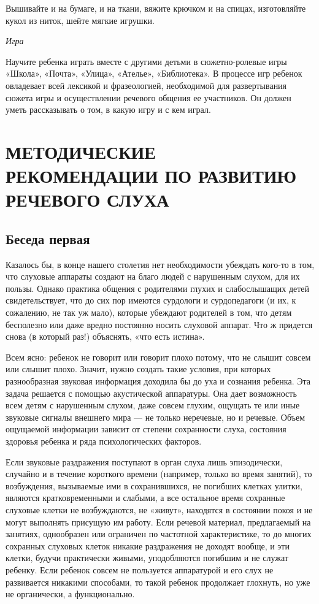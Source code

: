 \documentclass{book}
\renewcommand{\emph}[1]{\textit{#1}}
\begin{document}
Вышивайте и на бумаге, и на ткани, вяжите крючком и на спицах,
изготовляйте кукол из ниток, шейте мягкие игрушки.

\emph{Игра}

Научите ребенка играть вместе с другими детьми в сюжетно-ролевые игры
«Школа», «Почта», «Улица», «Ателье», «Библиотека». В процессе игр
ребенок овладевает всей лексикой и фразеологией, необходимой для
развертывания сюжета игры и осуществлении речевого общения ее
участников. Он должен уметь рассказывать о том, в какую игру и с кем
играл.

\section{МЕТОДИЧЕСКИЕ РЕКОМЕНДАЦИИ ПО РАЗВИТИЮ РЕЧЕВОГО СЛУХА}

\subsection*{Беседа первая}

Казалось бы, в конце нашего столетия нет необходимости убеждать кого-то
в том, что слуховые аппараты создают на благо людей с нарушенным слухом,
для их пользы. Однако практика общения с родителями глухих и
слабослышащих детей свидетельствует, что до сих пор имеются сурдологи и
сурдопедагоги (и их, к сожалению, не так уж мало), которые убеждают
родителей в том, что детям бесполезно или даже вредно постоянно носить
слуховой аппарат. Что ж придется снова (в который раз!) объяснять, «что
есть истина».

Всем ясно: ребенок не говорит или говорит плохо потому, что не слышит
совсем или слышит плохо. Значит, нужно создать такие условия, при
которых разнообразная звуковая информация доходила бы до уха и сознания
ребенка. Эта задача решается с помощью акустической аппаратуры. Она дает
возможность всем детям с нарушенным слухом, даже совсем глухим, ощущать
те или иные звуковые сигналы внешнего мира --- не только неречевые, но и
речевые. Объем ощущаемой информации зависит от степени сохранности
слуха, состояния здоровья ребенка и ряда психологических факторов.

Если звуковые раздражения поступают в орган слуха лишь эпизодически,
случайно и в течение короткого времени (например, только во время
занятий), то возбуждения, вызываемые ими в сохранившихся, не погибших
клетках улитки, являются кратковременными и слабыми, а все остальное
время сохранные слуховые клетки не возбуждаются, не «живут», находятся в
состоянии покоя и не могут выполнять присущую им работу. Если речевой
материал, предлагаемый на занятиях, однообразен или ограничен по
частотной характеристике, то до многих сохранных слуховых клеток никакие
раздражения не доходят вообще, и эти клетки, будучи практически живыми,
уподобляются погибшим и не служат ребенку. Если ребенок совсем не
пользуется аппаратурой и его слух не развивается никакими способами, то
такой ребенок продолжает глохнуть, но уже не органически, а
функционально.
\end{document}
